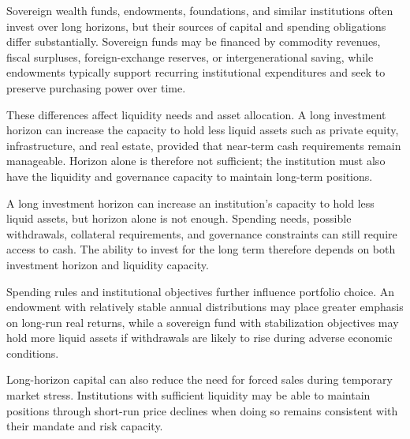 Sovereign wealth funds, endowments, foundations, and similar institutions often invest over long horizons, but their sources of capital and spending obligations differ substantially. Sovereign funds may be financed by commodity revenues, fiscal surpluses, foreign-exchange reserves, or intergenerational saving, while endowments typically support recurring institutional expenditures and seek to preserve purchasing power over time.

These differences affect liquidity needs and asset allocation. A long investment horizon can increase the capacity to hold less liquid assets such as private equity, infrastructure, and real estate, provided that near-term cash requirements remain manageable. Horizon alone is therefore not sufficient; the institution must also have the liquidity and governance capacity to maintain long-term positions.



\begin{tcolorbox}[
  enhanced,
  breakable,
  colback=white,
  colframe=FinanceBlue,
  boxrule=0.7pt,
  sharp corners,
  borderline west={2.2pt}{0pt}{FinanceBlue},
  title=\textbf{Financial Perspective: A Long Horizon Does Not Eliminate Liquidity Constraints},
  coltitle=white,
  colbacktitle=FinanceBlue,
  fonttitle=\bfseries,
  before skip=1.2em,
  after skip=1.2em
]

A long investment horizon can increase an institution's capacity to hold less liquid assets, but horizon alone is not enough. Spending needs, possible withdrawals, collateral requirements, and governance constraints can still require access to cash. The ability to invest for the long term therefore depends on both investment horizon and liquidity capacity.

\end{tcolorbox}

Spending rules and institutional objectives further influence portfolio choice. An endowment with relatively stable annual distributions may place greater emphasis on long-run real returns, while a sovereign fund with stabilization objectives may hold more liquid assets if withdrawals are likely to rise during adverse economic conditions.

Long-horizon capital can also reduce the need for forced sales during temporary market stress. Institutions with sufficient liquidity may be able to maintain positions through short-run price declines when doing so remains consistent with their mandate and risk capacity.

